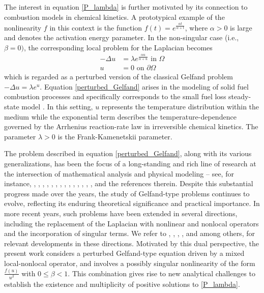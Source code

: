 \documentclass[reqno,oneside]{amsart}
\theoremstyle{definition}
\theoremstyle{remark}
\numberwithin{equation}{section}
\newcommand{\la} {\lambda}
\newcommand{\Om} {\Omega}
\newcommand{\pa}{\partial}
\newcommand{\De} {\Delta}
\begin{document}
The interest in equation \eqref{P_lambda} is further motivated by its connection to combustion models in chemical kinetics. A prototypical example of the nonlinearity $f$ in this context is the function $f(t) = e^{\frac{\alpha t}{\alpha +t}}$, where $\alpha>0$ is large and denotes the activation energy parameter. In the non-singular case (i.e., $\beta =0)$, the corresponding local problem for the Laplacian becomes
\begin{equation}\label{perturbed_Gelfand}
    \begin{aligned}
        -\De u &= \la e^{\frac{\alpha u}{\alpha + u}} \text{ in } \Om\\
        u &=0 \text{ on } \pa\Om
    \end{aligned}
\end{equation}
which is regarded as a perturbed version of the classical Gelfand problem $-\De u = \la e^u$. Equation \eqref{perturbed_Gelfand} arises in the modeling of solid fuel combustion processes and specifically corresponds to the small fuel loss steady-state model \cite{bebernes2013mathematical}. In this setting, $u$ represents the temperature distribution within the medium while the exponential term describes the temperature-dependence governed by the Arrhenius reaction-rate law in irreversible chemical kinetics. The parameter $\la>0$ is the Frank-Kamenetskii parameter.

The problem described in equation \eqref{perturbed_Gelfand}, along with its various generalizations, has been the focus of a long-standing and rich line of research at the intersection of mathematical analysis and physical modeling -- see, for instance, \cite{bratu1914equations}, \cite{parks1961criticality}, \cite{gelfand1963}, \cite{joseph1972}, \cite{parter1974}, \cite{sattinger1975nonlinear}, \cite{tam1979}, \cite{dancer1980}, \cite{brown1981s}, \cite{du2001conjecture}, \cite{ramaswamy2004multiple}, \cite{hung2011jde}, \cite{huang2015bifurcation}, \cite{huang2016one}, and the references therein. Despite this substantial progress made over the years, the study of Gelfand-type problems continues to evolve, reflecting its enduring theoretical significance and practical importance. In more recent years, such problems have been extended in several directions, including the replacement of the Laplacian with nonlinear and nonlocal operators and the incorporation of singular terms. We refer to \cite{wang2008p}, \cite{rosoton2014fractional}, \cite{charro2023infinity}, \cite{huang2025minkowski}, \cite{molino2016singular} and \cite{molino2025random} among others, for relevant developments in these directions. Motivated by this dual perspective, the present work considers a perturbed Gelfand-type equation driven by a mixed local-nonlocal operator, and involves a possibly singular nonlinearity of the form $\frac{f(u)}{u^{\beta}}$ with $0\leq \beta<1$. This combination gives rise to new analytical challenges to establish the existence and multiplicity of positive solutions to \eqref{P_lambda}.
\end{document}
